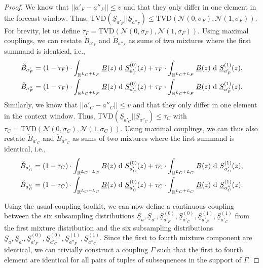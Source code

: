 \begin{proof}
    We know that $||a'_F - a''_F|| \leq v$ and that they only differ in one element in the forecast window.
    Thus, $\mathrm{TVD}(\underline{S}_{a'_F} || \underline{S}_{a''_F}) \leq \mathrm{TVD}(\mathcal{N}(0,\sigma_F), \mathcal{N}(1,\sigma_F))$. 
    For brevity, let us define $\tau_F = \mathrm{TVD}(\mathcal{N}(0,\sigma_F), \mathcal{N}(1,\sigma_F))$. 
    Using  maximal couplings, we can restate $\check{B}_{a'_F}$ and $\check{B}_{a''_F}$ as sums of two mixtures where the first summand is identical, i.e., 
    \begin{align*}
        \check{B}_{a'_F} & =
        (1 - \tau_F)
        \cdot  \int_{\sR^{L_C + L_F}} \underline{B}(z) \  \dd  \ \underline{S}_{a'_F}^{(0)}(z)
        +
        \tau_F
        \cdot  \int_{\sR^{L_C + L_F}} \underline{B}(z)  \ \dd \  \underline{S}_{a'_F}^{(1)}(z),
        \\
        \check{B}_{a''_F} &=
        (1 - \tau_F)
        \cdot  \int_{\sR^{L_C + L_F}} \underline{B}(z)  \ \dd \  \underline{S}_{a'_F}^{(0)}(z)
        +
        \tau_F
        \cdot  \int_{\sR^{L_C + L_F}} \underline{B}(z)  \ \dd  \ \underline{S}_{a''_F}^{(1)}(z).
    \end{align*}
    Similarly, we know that $||a'_C - a''_C|| \leq v$ and that they only differ in one element in the context window.
    Thus, $\mathrm{TVD}(\underline{S}_{a'_C} || \underline{S}_{a''_C}) \leq \tau_C$
    with $\tau_C = \mathrm{TVD}(\mathcal{N}(0,\sigma_C), \mathcal{N}(1,\sigma_C))$. 
    Using  maximal couplings, we can thus also restate $\check{B}_{a'_C}$ and $\check{B}_{a''_C}$ as sums of two mixtures where the first summand is identical, i.e., 
    \begin{align*}
        \check{B}_{a'_C} & =
        (1 - \tau_C)
        \cdot  \int_{\sR^{L_C + L_C}} \underline{B}(z)  \ \dd  \ \underline{S}_{a'_C}^{(0)}(z)
        +
        \tau_C
        \cdot  \int_{\sR^{L_C + L_C}} \underline{B}(z) \  \dd  \ \underline{S}_{a'_C}^{(1)}(z),
        \\
        \check{B}_{a''_C} &=
        (1 - \tau_C)
        \cdot  \int_{\sR^{L_C + L_C}} \underline{B}(z) \  \dd \ \underline{S}_{a'_C}^{(0)}(z)
        +
        \tau_C
        \cdot  \int_{\sR^{L_C + L_C}} \underline{B}(z) \  \dd \  \underline{S}_{a''_C}^{(1)}(z).
    \end{align*}

    Using the usual coupling toolkit, we can now define a continuous coupling between the six subsampling distributions
    $\underline{S}_{a}, \underline{S}_{a'}, \underline{S}_{a'_F}^{(0)}, \underline{S}_{a'_C}^{(0)}, \underline{S}_{a'_F}^{(1)}, \underline{S}_{a'_C}^{(1)}$ from the first mixture distribution
    and the six subsampling distributions
    $\underline{S}_{a}, \underline{S}_{a'}, \underline{S}_{a'_F}^{(0)}, \underline{S}_{a'_C}^{(0)}, \underline{S}_{a''_F}^{(1)}, \underline{S}_{a''_C}^{(1)}$.
    Since the first to fourth  mixture component are identical,
    we can trivially construct a coupling $\Gamma$ such that the first to fourth element
    are identical for all pairs of tuples of subsequences in the support of $\Gamma$.


\end{proof}
